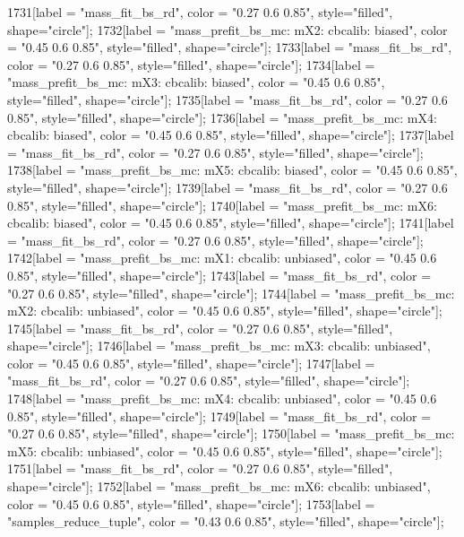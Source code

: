 {	1731[label = "mass_fit_bs_rd", color = "0.27 0.6 0.85", style="filled", shape="circle"];
	1732[label = "mass_prefit_bs_mc\nmassbin: mX2\nmassmodel: cbcalib\ntrigger: biased", color = "0.45 0.6 0.85", style="filled", shape="circle"];
	1733[label = "mass_fit_bs_rd", color = "0.27 0.6 0.85", style="filled", shape="circle"];
	1734[label = "mass_prefit_bs_mc\nmassbin: mX3\nmassmodel: cbcalib\ntrigger: biased", color = "0.45 0.6 0.85", style="filled", shape="circle"];
	1735[label = "mass_fit_bs_rd", color = "0.27 0.6 0.85", style="filled", shape="circle"];
	1736[label = "mass_prefit_bs_mc\nmassbin: mX4\nmassmodel: cbcalib\ntrigger: biased", color = "0.45 0.6 0.85", style="filled", shape="circle"];
	1737[label = "mass_fit_bs_rd", color = "0.27 0.6 0.85", style="filled", shape="circle"];
	1738[label = "mass_prefit_bs_mc\nmassbin: mX5\nmassmodel: cbcalib\ntrigger: biased", color = "0.45 0.6 0.85", style="filled", shape="circle"];
	1739[label = "mass_fit_bs_rd", color = "0.27 0.6 0.85", style="filled", shape="circle"];
	1740[label = "mass_prefit_bs_mc\nmassbin: mX6\nmassmodel: cbcalib\ntrigger: biased", color = "0.45 0.6 0.85", style="filled", shape="circle"];
	1741[label = "mass_fit_bs_rd", color = "0.27 0.6 0.85", style="filled", shape="circle"];
	1742[label = "mass_prefit_bs_mc\nmassbin: mX1\nmassmodel: cbcalib\ntrigger: unbiased", color = "0.45 0.6 0.85", style="filled", shape="circle"];
	1743[label = "mass_fit_bs_rd", color = "0.27 0.6 0.85", style="filled", shape="circle"];
	1744[label = "mass_prefit_bs_mc\nmassbin: mX2\nmassmodel: cbcalib\ntrigger: unbiased", color = "0.45 0.6 0.85", style="filled", shape="circle"];
	1745[label = "mass_fit_bs_rd", color = "0.27 0.6 0.85", style="filled", shape="circle"];
	1746[label = "mass_prefit_bs_mc\nmassbin: mX3\nmassmodel: cbcalib\ntrigger: unbiased", color = "0.45 0.6 0.85", style="filled", shape="circle"];
	1747[label = "mass_fit_bs_rd", color = "0.27 0.6 0.85", style="filled", shape="circle"];
	1748[label = "mass_prefit_bs_mc\nmassbin: mX4\nmassmodel: cbcalib\ntrigger: unbiased", color = "0.45 0.6 0.85", style="filled", shape="circle"];
	1749[label = "mass_fit_bs_rd", color = "0.27 0.6 0.85", style="filled", shape="circle"];
	1750[label = "mass_prefit_bs_mc\nmassbin: mX5\nmassmodel: cbcalib\ntrigger: unbiased", color = "0.45 0.6 0.85", style="filled", shape="circle"];
	1751[label = "mass_fit_bs_rd", color = "0.27 0.6 0.85", style="filled", shape="circle"];
	1752[label = "mass_prefit_bs_mc\nmassbin: mX6\nmassmodel: cbcalib\ntrigger: unbiased", color = "0.45 0.6 0.85", style="filled", shape="circle"];
	1753[label = "samples_reduce_tuple", color = "0.43 0.6 0.85", style="filled", shape="circle"];
}
